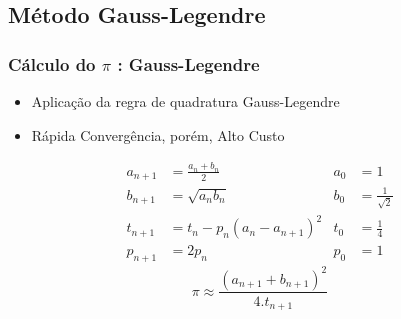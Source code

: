 \documentclass{beamer}
\newcommand\safepi[0]{
	\texorpdfstring{$\pi$}{Pi}
}
\begin{document}

\begin{frame}

\subsection{Método Gauss-Legendre}
\frametitle{Cálculo do \safepi: Gauss-Legendre}

\begin{itemize}
    \item Aplicação da regra de quadratura Gauss-Legendre
    \item Rápida Convergência, porém, Alto Custo
\end{itemize}

\begin{equation}
	\begin{aligned}
		a_{n+1} &= \frac{a_n + b_n}{2}			& a_0 &= 1\\
		b_{n+1} &= \sqrt{a_n b_n}				& b_0 &= \frac{1}{\sqrt{2}} \\
		t_{n+1} &= t_n - p_n(a_{n}-a_{n+1})^2	& t_0 &= \frac{1}{4} \\
		p_{n+1} &= 2p_n							& p_0 &= 1		
	\end{aligned}
\end{equation}
\begin{equation}
	\pi \approx \frac{(a_{n+1}+b_{n+1})^2}{4.t_{n+1}}
\end{equation}
	
\end{frame}

\end{document}
